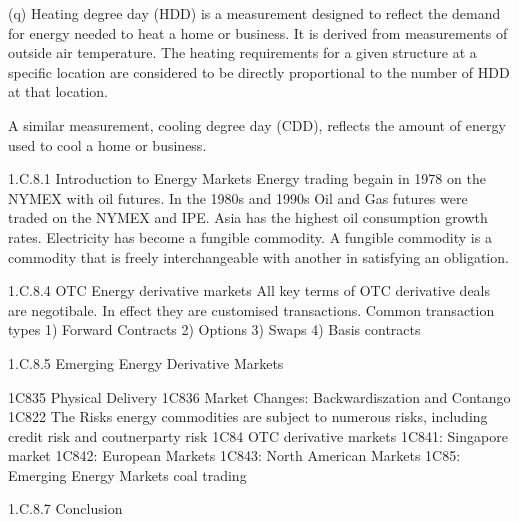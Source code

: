 (q) Heating degree day (HDD) is a measurement designed to reflect the demand for energy needed to heat a home or business. It is derived from measurements of outside air temperature. The heating requirements for a given structure at a specific location are considered to be directly proportional to the number of HDD at that location. 

A similar measurement, cooling degree day (CDD), reflects the amount of energy used to cool a home or business.

1.C.8.1  Introduction to Energy Markets
Energy trading begain in 1978 on the NYMEX with oil futures.
In the 1980s and 1990s Oil and Gas futures were traded on the NYMEX and IPE.
Asia has the highest oil consumption growth rates.
Electricity has become a fungible commodity.
A fungible commodity is a commodity that is freely interchangeable with another in satisfying an obligation.
 


1.C.8.4 OTC Energy derivative markets
All key terms of OTC derivative deals are negotibale. In effect they are customised transactions.
Common transaction types
1) Forward Contracts
2) Options
3) Swaps
4) Basis contracts




1.C.8.5 Emerging Energy Derivative Markets
 
 

1C835 Physical Delivery
1C836 Market Changes: Backwardiszation and Contango
1C822 The Risks
energy commodities are subject to numerous risks, including credit risk and coutnerparty risk
1C84 OTC derivative markets
1C841: Singapore market
1C842: European Markets
1C843: North American Markets
1C85: Emerging Energy Markets
coal trading
 


1.C.8.7 Conclusion 
